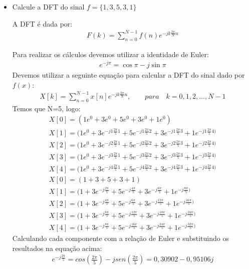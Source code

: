 \documentclass[12pt]{article}
\begin{document}
\begin{itemize}
\begin{itemize}
\item Calcule a DFT do sinal $f = \{1,3,5,3,1\}$

A DFT é dada por:
\begin{align*}
    F(k) = \sum\limits_{n=0}^{N-1} f(n) e^{-jk\frac{2\pi}{N}n}
\end{align*}

Para realizar os cálculos devemos utilizar a identidade de Euler:
\begin{align*}
    e^{-j \pi} = \cos \pi - j\sin\pi
\end{align*}
Devemos utilizar a seguinte equação para calcular a DFT do sinal dado por $f(x)$:
\begin{align*}
    X[k] = \sum\limits_{n=0}^{N-1} x[n] e^{-jk\frac{2\pi}{N}n},\qquad para\quad k=0,1,2,...,N-1
\end{align*}
Temos que N=5, logo:
\begin{align*}
    &X[0] = (1e^0 + 3e^0 + 5e^0 + 3e^0 + 1e^0) &\\
    &X[1] = (1e^0 + 3e^{-j1\frac{2\pi}{5}1} + 5e^{-j1\frac{2\pi}{5}2} + 3e^{-j1\frac{2\pi}{5}3} + 1e^{-j1\frac{2\pi}{5}4)} &\\
    &X[2] = (1e^0 + 3e^{-j2\frac{2\pi}{5}1} + 5e^{-j2\frac{2\pi}{5}2} + 3e^{-j2\frac{2\pi}{5}3} + 1e^{-j2\frac{2\pi}{5}4)} &\\
    &X[3] = (1e^0 + 3e^{-j3\frac{2\pi}{5}1} + 5e^{-j3\frac{2\pi}{5}2} + 3e^{-j3\frac{2\pi}{5}3} + 1e^{-j3\frac{2\pi}{5}4)} &\\
    &X[4] = (1e^0 + 3e^{-j4\frac{2\pi}{5}1} + 5e^{-j4\frac{2\pi}{5}2} + 3e^{-j4\frac{2\pi}{5}3} + 1e^{-j4\frac{2\pi}{5}4)} &\\
    &X[0] = (1 + 3 + 5 + 3 + 1) &\\
    &X[1] = (1 + 3e^{-j\frac{2\pi}{5}} + 5e^{-j\frac{4\pi}{5}}  + 3e^{-j\frac{6\pi}{5}}  + 1e^{-j\frac{8\pi}{5})} &\\
    &X[2] = (1 + 3e^{-j\frac{4\pi}{5}} + 5e^{-j\frac{6\pi}{5}}  + 3e^{-j\frac{12\pi}{5}} + 1e^{-j\frac{16\pi}{5})} &\\
    &X[3] = (1 + 3e^{-j\frac{6\pi}{5}} + 5e^{-j\frac{12\pi}{5}} + 3e^{-j\frac{18\pi}{5}} + 1e^{-j\frac{24\pi}{5})} &\\
    &X[4] = (1 + 3e^{-j\frac{8\pi}{5}} + 5e^{-j\frac{16\pi}{5}} + 3e^{-j\frac{24\pi}{5}} + 1e^{-j\frac{32\pi}{5})}&
\end{align*}
Calculando cada componente com a relação de Euler e substituindo os resultados na equação acima:
\begin{align*}
    &e^{-j\frac{2\pi}{5}} = cos(\frac{2\pi}{5}) - jsen(\frac{2\pi}{5}) = 0,30902  - 0,95106j &\\

\end{align*}
\end{itemize}
\end{itemize}
\end{document}
